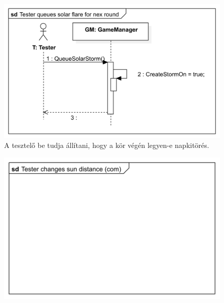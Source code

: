 \begin{figure}[H] 
\centering 
\includegraphics[width=1\textwidth]{docs/img/svg/Skeleton!Solar flare!Interaction1!Tester queues solar flare for nex round_34.png} 
\caption{A tesztelő be tudja állítani, hogy a kör végén legyen-e napkitörés.} 
\end{figure} 

\begin{figure}[H] 
\centering 
\includegraphics[width=1\textwidth]{docs/img/svg/Skeleton!Move asteroid field!Change Sun Distance!Communication!Tester changes sun distance (com)_37.png} 
\end{figure} 

